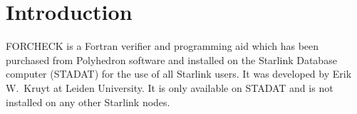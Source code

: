  \newpage
 \begin{latexonly}
   \setlength{\parskip}{0mm}
   \latexonlytoc
   \setlength{\parskip}{\medskipamount}
   \markright{\stardocname}
 \end{latexonly}
\newpage
\renewcommand{\thepage}{\arabic{page}}
\setcounter{page}{1}

\section{Introduction}

FORCHECK is a Fortran verifier and programming aid which has been purchased
from Polyhedron software and installed on the Starlink Database computer
(STADAT) for the use of all Starlink users.
It was developed by Erik W.\ Kruyt at Leiden University.
It is only available on STADAT and is not installed on any other Starlink
nodes.

